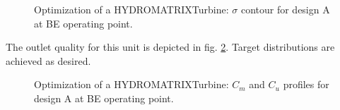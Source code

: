 \begin{figure}[h!]
\begin{minipage}[b]{1\linewidth}
 \centering
\end{minipage}
\caption{Optimization of a HYDROMATRIX\circledR Turbine: $\sigma$ contour for design A at BE operating point.}
\label{All_press}
\end{figure}


The outlet quality for this unit is depicted in fig. \ref{out_MAT}. Target distributions are achieved as desired.


\begin{figure}[h!]
\begin{minipage}[b]{1\linewidth}
 \centering
\end{minipage}
\caption{Optimization of a HYDROMATRIX\circledR Turbine: $C_m$ and $C_u$ profiles for design A at BE operating point.}
\label{out_MAT}
\end{figure}

